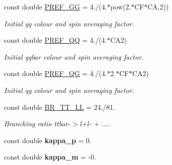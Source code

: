 \begin{DoxyCompactItemize}
\item 
\hypertarget{namespaceConstants_a86300d39a41e924fc25d986be2e42de1}{}const double \hyperlink{namespaceConstants_a86300d39a41e924fc25d986be2e42de1}{P\+R\+E\+F\+\_\+\+G\+G} = 4./(4.$\ast$pow(2.$\ast$C\+F$\ast$C\+A,2))\label{namespaceConstants_a86300d39a41e924fc25d986be2e42de1}

\begin{DoxyCompactList}\small\item\em Initial gg colour and spin averaging factor. \end{DoxyCompactList}\item 
\hypertarget{namespaceConstants_a1f51674d250f71ebde34af46ff997504}{}const double \hyperlink{namespaceConstants_a1f51674d250f71ebde34af46ff997504}{P\+R\+E\+F\+\_\+\+Q\+Q} = 4./(4.$\ast$C\+A2)\label{namespaceConstants_a1f51674d250f71ebde34af46ff997504}

\begin{DoxyCompactList}\small\item\em Initial qqbar colour and spin averaging factor. \end{DoxyCompactList}\item 
\hypertarget{namespaceConstants_a51ed5e005486d4e9af1c3a84eb3be1ba}{}const double \hyperlink{namespaceConstants_a51ed5e005486d4e9af1c3a84eb3be1ba}{P\+R\+E\+F\+\_\+\+Q\+G} = 4./(4.$\ast$2.$\ast$C\+F$\ast$C\+A2)\label{namespaceConstants_a51ed5e005486d4e9af1c3a84eb3be1ba}

\begin{DoxyCompactList}\small\item\em Initial qg colour and spin averaging factor. \end{DoxyCompactList}\item 
\hypertarget{namespaceConstants_a08dd306759548b9ee421fca4602579e2}{}const double \hyperlink{namespaceConstants_a08dd306759548b9ee421fca4602579e2}{B\+R\+\_\+\+T\+T\+\_\+\+L\+L} = 24./81.\label{namespaceConstants_a08dd306759548b9ee421fca4602579e2}

\begin{DoxyCompactList}\small\item\em Branching ratio ttbar-\/$>$l+l-\/ + .... \end{DoxyCompactList}\item 
\hypertarget{namespaceConstants_ade805da717cf52ba609b7ecff6420d9c}{}const double {\bfseries kappa\+\_\+p} = 0.\label{namespaceConstants_ade805da717cf52ba609b7ecff6420d9c}

\item 
\hypertarget{namespaceConstants_aba38022d2360cec5d8f4e482706f7661}{}const double {\bfseries kappa\+\_\+m} = -\/0.\label{namespaceConstants_aba38022d2360cec5d8f4e482706f7661}


\end{DoxyCompactItemize}
